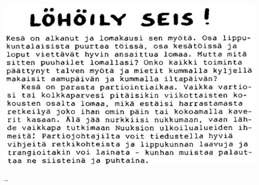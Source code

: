 \vspace*{1.28cm}
\begin{StickyNote}
	\monofont


	\begin{center}
		\includegraphics[width=1\textwidth]{assets/löhöilyseis3}
	\end{center}



	\vspace*{0.08cm}
	{\hspace{0.16cm}\Large\ldots}
	\vspace*{0.32cm}

\end{StickyNote}

